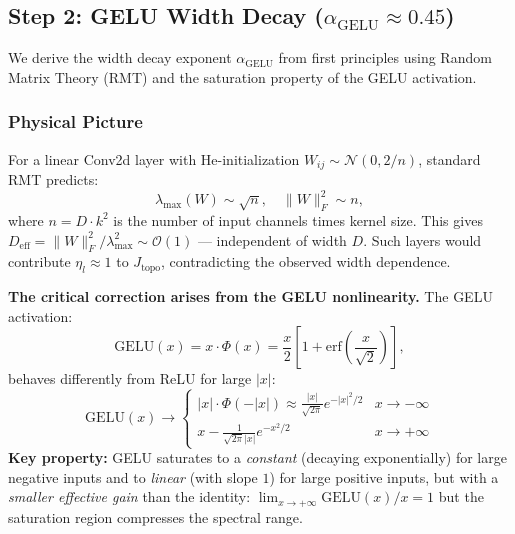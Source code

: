 
\subsection{Step 2: GELU Width Decay ($\alpha_{\mathrm{GELU}} \approx 0.45$)}\label{sec:gelu-derivation}

We derive the width decay exponent $\alpha_{\mathrm{GELU}}$ from first principles using Random Matrix Theory (RMT) and the saturation property of the GELU activation.

\subsubsection{Physical Picture}

For a linear Conv2d layer with He-initialization $W_{ij} \sim \mathcal{N}(0, 2/n)$, standard RMT predicts:
\begin{equation}
\lambda_{\max}(W) \sim \sqrt{n}, \quad \|W\|_F^2 \sim n,
\end{equation}
where $n = D \cdot k^2$ is the number of input channels times kernel size. This gives $D_{\mathrm{eff}} = \|W\|_F^2 / \lambda_{\max}^2 \sim \mathcal{O}(1)$ --- independent of width $D$. Such layers would contribute $\eta_l \approx 1$ to $J_{\mathrm{topo}}$, contradicting the observed width dependence.

\textbf{The critical correction arises from the GELU nonlinearity.} The GELU activation:
\begin{equation}
\mathrm{GELU}(x) = x \cdot \Phi(x) = \frac{x}{2}\left[1 + \mathrm{erf}\left(\frac{x}{\sqrt{2}}\right)\right],
\end{equation}
behaves differently from ReLU for large $|x|$:
\begin{equation}
\mathrm{GELU}(x) \to \begin{cases}
|x| \cdot \Phi(-|x|) \approx \frac{|x|}{\sqrt{2\pi}} e^{-|x|^2/2} & x \to -\infty \\[6pt]
x - \frac{1}{\sqrt{2\pi}|x|} e^{-x^2/2} & x \to +\infty
\end{cases}
\end{equation}
\textbf{Key property:} GELU saturates to a \emph{constant} (decaying exponentially) for large negative inputs and to \emph{linear} (with slope $1$) for large positive inputs, but with a \emph{smaller effective gain} than the identity: $\lim_{x\to+\infty} \mathrm{GELU}(x)/x = 1$ but the saturation region compresses the spectral range.

